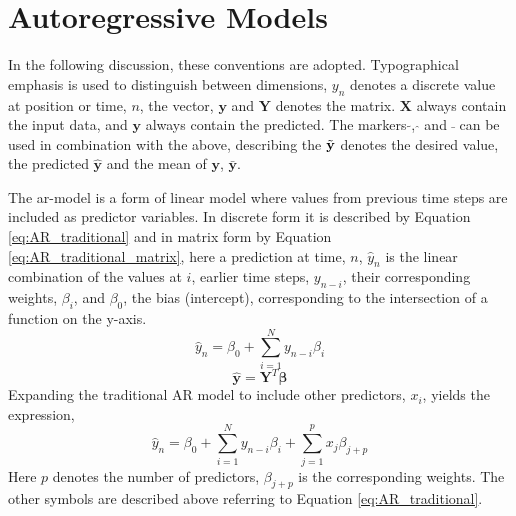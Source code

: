 \section{Autoregressive Models} \label{sec:ARmodels}
In the following discussion, these conventions are adopted. Typographical emphasis is used to distinguish between dimensions, $y_n$ denotes a discrete value at position or time, $n$, the vector, $\mathbf{y}$ and $\mathbf{Y}$ denotes the matrix. $\mathbf{X}$ always contain the input data, and $\mathbf{y}$ always contain the predicted. The markers $\tilde{ }$, $\hat{ }$ and $\bar{ }$ can be used in combination with the above, describing the $\Tilde{\mathbf{y}}$ denotes the desired value, the predicted $\hat{\mathbf{y}}$ and the mean of $\mathbf{y}$, $\bar{\mathbf{y}}$.


The \acrshort{ar}-model is a form of linear model where values from previous time steps are included as predictor variables. In discrete form it is described by Equation \eqref{eq:AR_traditional} and in matrix form by Equation \eqref{eq:AR_traditional_matrix}, here a prediction at time, $n$, $\hat{y}_n$ is the linear combination of the values at $i$, earlier time steps, $y_{n-i}$, their corresponding weights, $\beta_i$, and $\beta_0$, the bias (intercept), corresponding to the intersection of a function on the y-axis. 
\begin{equation} \label{eq:AR_traditional}
    \hat{y}_n = \beta_0 + \sum_{i = 1}^{N} y_{n-i} \beta_{i}
\end{equation}
\begin{equation} \label{eq:AR_traditional_matrix}
    \hat{\mathbf{y}} = \mathbf{Y}^T \mathbf{\beta}
\end{equation}
Expanding the traditional AR model to include other predictors, $x_i$, yields the expression,
\begin{equation} \label{eq:AR_expression}
    \hat{y}_n = \beta_0 + \sum_{i = 1}^{N} y_{n-i}\beta_{i}+ \sum_{j=1}^p x_j\beta_{j+p}
\end{equation}
Here $p$ denotes the number of predictors, $\beta_{j+p}$ is the corresponding weights. The other symbols are described above referring to Equation \eqref{eq:AR_traditional}. 

